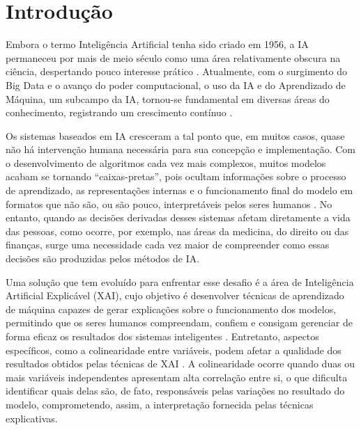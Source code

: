
\chapter[Introdução]{Introdução}
Embora o termo Inteligência Artificial tenha sido criado em 1956, a IA permaneceu por mais de meio século como uma área relativamente obscura na ciência, despertando pouco interesse prático \cite{haenlein2019BriefHistory}. Atualmente, com o surgimento do Big Data e o avanço do poder computacional, o uso da IA e do Aprendizado de Máquina, um subcampo da IA, tornou-se fundamental em diversas áreas do conhecimento, registrando um crescimento contínuo \cite{mijwil2022future}.

Os sistemas baseados em IA cresceram a tal ponto que, em muitos casos, quase não há intervenção humana necessária para sua concepção e implementação. Com o desenvolvimento de algoritmos cada vez mais complexos, muitos modelos acabam se tornando “caixas-pretas”, pois ocultam informações sobre o processo de aprendizado, as representações internas e o funcionamento final do modelo em formatos que não são, ou são pouco, interpretáveis pelos seres humanos \cite{koh2017understang}. No entanto, quando as decisões derivadas desses sistemas afetam diretamente a vida das pessoas, como ocorre, por exemplo, nas áreas da medicina, do direito ou das finanças, surge uma necessidade cada vez maior de compreender como essas decisões são produzidas pelos métodos de IA.

Uma solução que tem evoluído para enfrentar esse desafio é a área de Inteligência Artificial Explicável (XAI), cujo objetivo é desenvolver técnicas de aprendizado de máquina capazes de gerar explicações sobre o funcionamento dos modelos, permitindo que os seres humanos compreendam, confiem e consigam gerenciar de forma eficaz os resultados dos sistemas inteligentes \cite{arrieta2020explainable}. 
Entretanto, aspectos específicos, como a colinearidade entre variáveis, podem afetar a qualidade dos resultados obtidos pelas técnicas de XAI \cite{salih2025a_perpective}. A colinearidade ocorre quando duas ou mais variáveis independentes apresentam alta correlação entre si, o que dificulta identificar quais delas são, de fato, responsáveis pelas variações no resultado do modelo, comprometendo, assim, a interpretação fornecida pelas técnicas explicativas.


